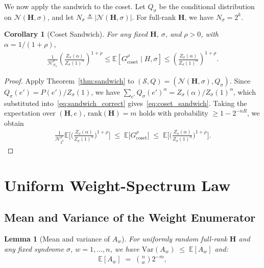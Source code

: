 \documentclass[journal,10pt,onecolumn]{IEEEtran}
\newtheorem{lemma}{Lemma}
\newtheorem{corollary}{Corollary}
\newcommand{\Eb}{\mathbb{E}}
\newcommand{\Nb}{\mathcal{N}}
\newcommand{\Hm}{\mathbf{H}}
\newcommand{\Harm}{\mathcal{H}}
\begin{document}
We now apply the sandwich to the coset.
Let $Q_\sigma$ be the conditional distribution on $\Nb(\Hm,\sigma)$, and let
\(
N_\sigma \triangleq |\Nb(\Hm,\sigma)|.
\)
For full-rank $\Hm$, we have $N_\sigma = 2^k$.

\begin{corollary}[Coset Sandwich]
\label{cor:coset_sandwich}
For any fixed $\Hm$, $\sigma$, and $\rho>0$, with $\alpha=1/(1+\rho)$,
\begin{align}
    \frac{1}{\Harm_{N_\sigma}^{\rho}}
    \left(\frac{Z_\sigma(\alpha)}{Z_\sigma(1)^\alpha}\right)^{1+\rho}
    \le
    \Eb\!\left[G_{\mathrm{coset}}^\rho \mid H,\sigma\right]
    \le
    \left(\frac{Z_\sigma(\alpha)}{Z_\sigma(1)^\alpha}\right)^{1+\rho}.
    \label{eq:coset_sandwich}
\end{align}
\end{corollary}
\begin{proof}
Apply Theorem~\ref{thm:sandwich} to $(\mathcal{S},Q)=(\Nb(\Hm,\sigma),Q_\sigma)$.
Since $Q_\sigma(e')=P(e')/Z_\sigma(1)$, we have
$\sum_{e'}Q_\sigma(e')^\alpha = Z_\sigma(\alpha)/Z_\sigma(1)^\alpha$,
which substituted into~\eqref{eq:sandwich_correct} gives~\eqref{eq:coset_sandwich}.
Taking the expectation over $(\Hm,e)$, $\mathrm{rank}(\Hm)=m$ holds with probability
$\ge 1-2^{-nR}$, we obtain
\begin{align}
    \frac{1}{\Harm_{2^k}^{\rho}}
    \Eb\bigl[\bigl(\tfrac{Z_\sigma(\alpha)}{Z_\sigma(1)^\alpha}\bigr)^{1+\rho}\bigr]
    \;\le\;
    \Eb\bigl[G_{\mathrm{coset}}^\rho\bigr]
    \;\le\;
    \Eb\bigl[\bigl(\tfrac{Z_\sigma(\alpha)}{Z_\sigma(1)^\alpha}\bigr)^{1+\rho}\bigr].
    \label{eq:global_sandwich}
\end{align}
\end{proof}


\section{Uniform Weight-Spectrum Law}
\label{sec:spectrum}



\subsection{Mean and Variance of the Weight Enumerator}

\begin{lemma}[Mean and variance of $A_w$]
\label{lem:Aw_moments}
For uniformly random full-rank $\Hm$ and any fixed syndrome $\sigma$, \( w=1,\ldots,n\), we have \(\mathrm{Var}(A_w) \;\le\; \Eb[A_w]\) and:
\begin{align}
    \Eb[A_w] \;=\; \binom{n}{w}2^{-m}, \label{eq:Aw_mean}
\end{align}
\end{lemma}
\end{document}
